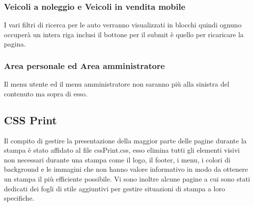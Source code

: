         \subsubsection{Veicoli a noleggio e Veicoli in vendita mobile}
        I vari filtri di ricerca per le auto verranno visualizzati in blocchi quindi ognuno occuperà un intera riga inclusi il bottone per il submit è quello per ricaricare la pagina.

        \subsubsection{Area personale ed Area amministratore}
        Il menu utente ed il menu amministratore non saranno più alla sinistra del contenuto ma sopra di esso.
    
    \subsection{CSS Print}
        Il compito di gestire la presentazione della maggior parte delle pagine durante la stampa è stato affidato al file cssPrint.css, esso elimina tutti gli elementi visivi non necessari durante una stampa come il logo, il footer, i menu, i colori di background e le immagini che non hanno valore informativo in modo da ottenere un stampa il più efficiente possibile.
        Vi sono inoltre alcune pagine a cui sono stati dedicati dei fogli di stile aggiuntivi per gestire situazioni di stampa a loro specifiche.



\pagebreak